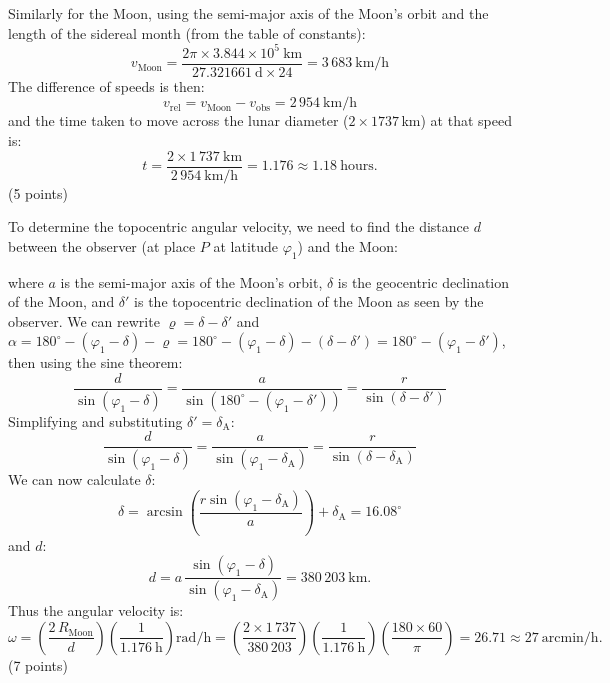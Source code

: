\begin{description}

  Similarly for the Moon, using the semi-major axis of the Moon's orbit and
  the length of the sidereal month (from the table of constants):
  \[
    v_{\mathrm{Moon}} = \frac{2\pi \times 3.844 \times 10^5\ \mathrm{km}}
                             {27.321661\ \mathrm{d} \times 24}
                      = 3\,683\ \mathrm{km/h}
  \]
  The difference of speeds is then:
  \[
    v_{\mathrm{rel}} = v_{\mathrm{Moon}} - v_{\mathrm{obs}}
                     = 2\,954\ \mathrm{km/h}
  \]
  and the time taken to move across the lunar diameter
  ($2 \times 1737$\,km) at that speed is:
  \[
    t = \frac{2 \times 1\,737\ \mathrm{km}}{2\,954\ \mathrm{km/h}}
      = 1.176 \approx 1.18\ \mathrm{hours}.
  \]
  \hfill(5 points)

\item[(c)] To determine the topocentric angular velocity, we need to find the
  distance $d$ between the observer (at place $P$ at latitude $\varphi_1$) and
  the Moon:


  where $a$ is the semi-major axis of the Moon's orbit, $\delta$ is the
  geocentric declination of the Moon, and $\delta'$ is the topocentric
  declination of the Moon as seen by the observer. We can rewrite
  $\varrho = \delta - \delta'$ and
  $\alpha = 180^\circ - (\varphi_1 - \delta) - \varrho
          = 180^\circ - (\varphi_1 - \delta) - (\delta - \delta')
          = 180^\circ - (\varphi_1 - \delta')$,
  then using the sine theorem:
  \[
    \frac{d}{\sin(\varphi_1 - \delta)}
      = \frac{a}{\sin\left(180^\circ - (\varphi_1 - \delta')\right)}
      = \frac{r}{\sin(\delta - \delta')}
  \]
  Simplifying and substituting $\delta' = \delta_{\mathrm{A}}$:
  \[
    \frac{d}{\sin(\varphi_1 - \delta)}
      = \frac{a}{\sin(\varphi_1 - \delta_{\mathrm{A}})}
      = \frac{r}{\sin(\delta - \delta_{\mathrm{A}})}
  \]
  We can now calculate $\delta$:
  \[
    \delta = \arcsin\left(
        \frac{r\sin(\varphi_1 - \delta_{\mathrm{A}})}{a}\right)
      + \delta_{\mathrm{A}} = 16.08^\circ
  \]
  and $d$:
  \[
    d = a\,\frac{\sin(\varphi_1 - \delta)}
                {\sin(\varphi_1 - \delta_{\mathrm{A}})}
      = 380\,203\ \mathrm{km}.
  \]
  Thus the angular velocity is:
  \[
    \omega = \left(\frac{2\,R_{\mathrm{Moon}}}{d}\right)
             \left(\frac{1}{1.176\ \mathrm{h}}\right) \mathrm{rad/h}
           = \left(\frac{2 \times 1\,737}{380\,203}\right)
             \left(\frac{1}{1.176\ \mathrm{h}}\right)
             \left(\frac{180 \times 60}{\pi}\right)
           = 26.71 \approx 27\ \mathrm{arcmin/h}.
  \]
  \hfill(7 points)


\end{description}
